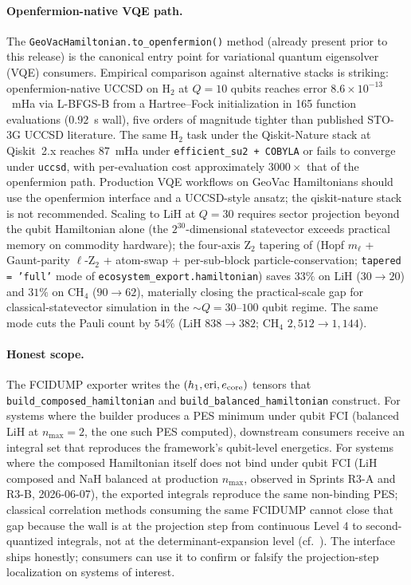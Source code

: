 \documentclass[twocolumn,pra,amsmath,amssymb,superscriptaddress]{revtex4-2}
\begin{document}
\paragraph{Openfermion-native VQE path.}  The
\texttt{GeoVacHamiltonian.to\_openfermion()} method (already
present prior to this release) is the canonical entry point
for variational quantum eigensolver (VQE) consumers.
Empirical comparison against alternative stacks is striking:
openfermion-native UCCSD on H$_2$ at $Q = 10$ qubits reaches
error $8.6 \times 10^{-13}$~mHa via L-BFGS-B from a
Hartree--Fock initialization in 165 function evaluations
($0.92$~s wall), five orders of magnitude tighter than
published STO-3G UCCSD literature.  The same H$_2$ task under
the Qiskit-Nature stack at Qiskit~2.x reaches $87$~mHa
under \texttt{efficient\_su2 + COBYLA} or fails to converge
under \texttt{uccsd}, with per-evaluation cost approximately
$3000\times$ that of the openfermion path.  Production VQE
workflows on GeoVac Hamiltonians should use the openfermion
interface and a UCCSD-style ansatz; the qiskit-nature stack
is not recommended.  Scaling to LiH at $Q = 30$ requires
sector projection beyond the qubit Hamiltonian alone (the
$2^{30}$-dimensional statevector exceeds practical memory on
commodity hardware); the four-axis Z$_2$ tapering of
\cite{GeoVac_Paper14} (Hopf $m_\ell$ + Gaunt-parity $\ell$-Z$_2$
+ atom-swap + per-sub-block particle-conservation; \texttt{tapered
= 'full'} mode of \texttt{ecosystem\_export.hamiltonian}) saves
$33\%$ on LiH ($30 \to 20$) and $31\%$ on CH$_4$ ($90 \to 62$),
materially closing the practical-scale gap for
classical-statevector simulation in the
$\sim Q = 30$--$100$ qubit regime.  The same mode cuts the Pauli
count by $54\%$ (LiH $838 \to 382$; CH$_4$ $2{,}512 \to 1{,}144$).

\paragraph{Honest scope.}  The FCIDUMP exporter writes the
$(h_1, \mathrm{eri}, e_{\rm core})$ tensors that
\texttt{build\_composed\_hamiltonian} and
\texttt{build\_balanced\_hamiltonian} construct.  For systems
where the builder produces a PES minimum under qubit FCI
(balanced LiH at $n_{\max}=2$, the one such PES computed),
downstream consumers receive an integral set that reproduces
the framework's qubit-level energetics.  For systems where
the composed Hamiltonian itself does not bind under qubit FCI
(LiH composed and NaH balanced at production
$n_{\max}$, observed in Sprints R3-A and R3-B,
2026-06-07), the exported integrals reproduce the same
non-binding PES; classical correlation methods consuming the
same FCIDUMP cannot close that gap because the wall is at
the projection step from continuous Level 4 to
second-quantized integrals, not at the determinant-expansion
level (cf.~\cite{GeoVac_Paper19}).  The interface
ships honestly; consumers can use it to confirm or falsify
the projection-step localization on systems of interest.
\end{document}
